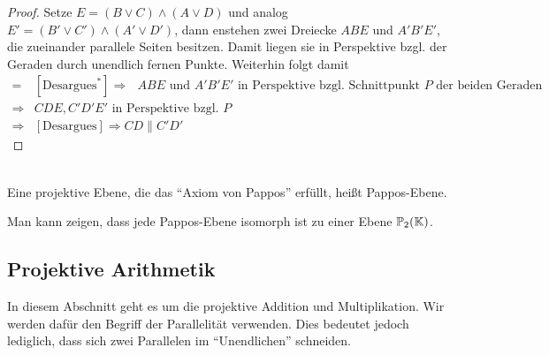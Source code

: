   \begin{proof}
    Setze $E=(B \vee C) \wedge (A \vee D)$ und analog $E' = (B' \vee C') \wedge (A' \vee D')$, dann enstehen zwei Dreiecke $ABE$ und
    $A'B'E'$, die zueinander parallele Seiten besitzen. Damit liegen sie in Perspektive bzgl. der Geraden durch unendlich fernen
    Punkte. Weiterhin folgt damit
    \begin{align*}
      = & [\mbox{Desargues}^*]\Rightarrow \mbox{ $ABE$ und $A'B'E'$ in Perspektive bzgl.
        Schnittpunkt $P$ der beiden Geraden} \\
      \Rightarrow & CDE, C'D'E' \mbox{ in Perspektive bzgl. $P$} \\
      \Rightarrow & [\mbox{Desargues}] \Rightarrow CD \parallel C'D'
    \end{align*}
  \end{proof}

  \begin{defi} \ \\
    Eine projektive Ebene, die das "`Axiom von Pappos"' erfüllt, heißt Pappos-Ebene.
  \end{defi}

  \begin{bem}
    Man kann zeigen, dass jede Pappos-Ebene isomorph ist zu einer Ebene $\mathbb{P}_2(\mathbb K)$.
  \end{bem}

\subsection*{Projektive Arithmetik}
    In diesem Abschnitt geht es um die projektive Addition und Multiplikation. Wir werden dafür den Begriff der Parallelität
    verwenden. Dies bedeutet jedoch lediglich, dass sich zwei Parallelen im "`Unendlichen"' schneiden.

